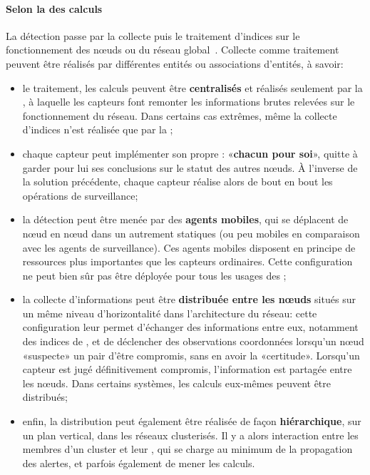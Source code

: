         \paragraph{Selon la  des calculs}
La détection passe par la collecte puis le traitement d'indices sur le fonctionnement des nœuds ou du réseau global~\cite{BMS13}.
Collecte comme traitement peuvent être réalisés par différentes entités ou associations d'entités, à savoir:
\begin{itemize}
    \item le traitement, les calculs peuvent être \textbf{centralisés} et réalisés seulement par la \sdb, à laquelle les capteurs font remonter les informations brutes relevées sur le fonctionnement du réseau. Dans certains cas extrêmes, même la collecte d'indices n'est réalisée que par la \sdb;
    \item chaque capteur peut implémenter son propre \ids: «\textbf{chacun pour soi}», quitte à garder pour lui ses conclusions sur le statut des autres nœuds. À l'inverse de la solution précédente, chaque capteur réalise alors de bout en bout les opérations de surveillance;
    \item la détection peut être menée par des \textbf{agents mobiles}, qui se déplacent de nœud en nœud dans un \rc autrement statiques (ou peu mobiles en comparaison avec les agents de surveillance). Ces agents mobiles disposent en principe de ressources plus importantes que les capteurs ordinaires. Cette configuration ne peut bien sûr pas être déployée pour tous les usages des \rcs;
    \item la collecte d'informations peut être \textbf{distribuée entre les nœuds} situés sur un même niveau d'horizontalité dans l'architecture du réseau: cette configuration leur permet d'échanger des informations entre eux, notamment des indices de , et de déclencher des observations coordonnées lorsqu'un nœud «suspecte» un pair d'être compromis, sans en avoir la «certitude». Lorsqu'un capteur est jugé définitivement compromis, l'information est partagée entre les nœuds. Dans certains systèmes, les calculs eux-mêmes peuvent être distribués;
    \item enfin, la distribution peut également être réalisée de façon \textbf{hiérarchique}, sur un plan vertical, dans les réseaux clusterisés. Il y a alors interaction entre les membres d'un cluster et leur \ch, qui se charge au minimum de la propagation des alertes, et parfois également de mener les calculs.
\end{itemize}

